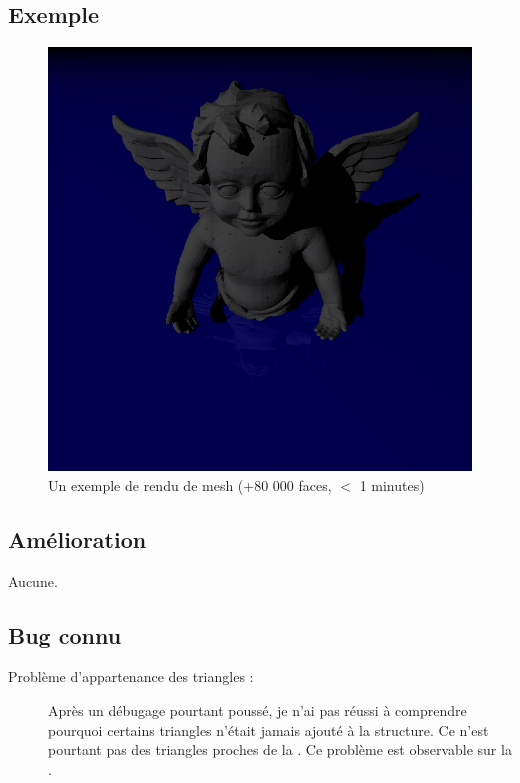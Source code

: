 \subsection{Exemple}
\begin{figure}[h]
  \begin{center}
    \includegraphics[width=1\textwidth, keepaspectratio=true]{../../diary/15.png}
    \caption{Un exemple de rendu de mesh (+80 000 faces, $<$ 1 minutes)\label{fig:angel}}
  \end{center}
\end{figure}

\subsection{Amélioration}
Aucune.

\subsection{Bug connu}
\begin{description}
  \item [Problème d'appartenance des triangles :] Après un débugage pourtant
    poussé, je n'ai pas réussi à comprendre pourquoi certains triangles
    n'était jamais ajouté à la structure. Ce n'est pourtant pas des triangles
    proches de la . Ce problème est observable sur la
    .
\end{description}
